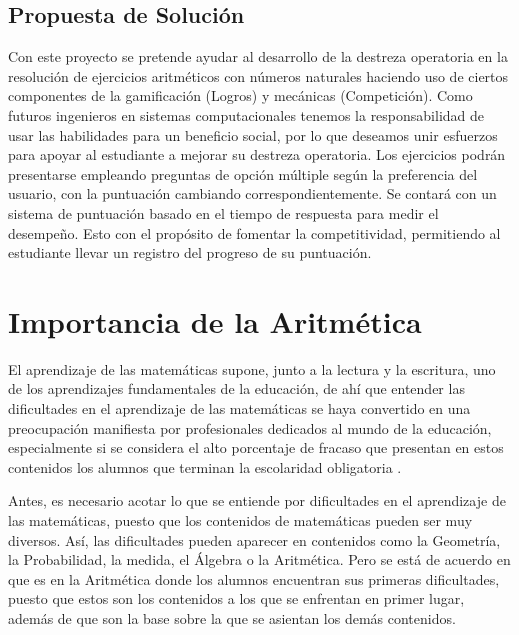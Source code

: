 \documentclass{article}
\begin{document}
\subsection{Propuesta de Solución}
Con este proyecto se pretende ayudar al desarrollo de la destreza operatoria en la resolución de ejercicios aritméticos con números naturales haciendo uso de ciertos componentes de la gamificación (Logros) y mecánicas (Competición). Como futuros ingenieros en sistemas computacionales tenemos la responsabilidad de usar las habilidades para un beneficio social, por lo que deseamos unir esfuerzos para apoyar al estudiante a mejorar su destreza operatoria.
Los ejercicios podrán presentarse empleando preguntas de opción múltiple según la preferencia del usuario,
con la puntuación cambiando correspondientemente. Se contará con un sistema de puntuación basado en el tiempo de
respuesta para medir el desempeño. Esto con el propósito de fomentar la competitividad, permitiendo al estudiante llevar
un registro del progreso de su puntuación.
\section{Importancia de la Aritmética}
El aprendizaje de las matemáticas supone, junto a la lectura y la escritura, uno de los aprendizajes fundamentales de la educación, de ahí que entender las dificultades en el aprendizaje de las matemáticas se haya convertido en una preocupación manifiesta por profesionales dedicados al mundo de la educación, especialmente si se considera el alto porcentaje de fracaso que presentan en estos contenidos los alumnos que terminan la escolaridad obligatoria \cite{pisa2010results}. 

Antes, es necesario acotar lo que se entiende por dificultades en el aprendizaje de las matemáticas, puesto que los contenidos de matemáticas pueden ser muy diversos. Así, las dificultades pueden aparecer en contenidos como la Geometría, la Probabilidad, la medida, el Álgebra o la Aritmética. Pero se está de acuerdo en que es en la Aritmética donde los alumnos encuentran sus primeras dificultades, puesto que estos son los contenidos a los que se enfrentan en primer lugar, además de que son la base sobre la que se asientan los demás contenidos. 
\end{document}

